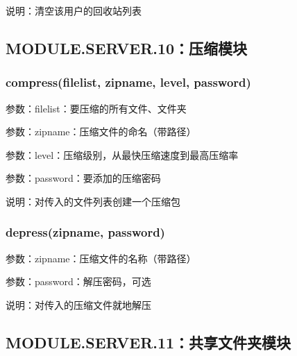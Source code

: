 说明：清空该用户的回收站列表

\subsection{MODULE.SERVER.10：压缩模块}
\subsubsection{compress(filelist, zipname, level, password)}

参数：filelist：要压缩的所有文件、文件夹

参数：zipname：压缩文件的命名（带路径）

参数：level：压缩级别，从最快压缩速度到最高压缩率

参数：password：要添加的压缩密码

说明：对传入的文件列表创建一个压缩包

\subsubsection{depress(zipname, password)}
参数：zipname：压缩文件的名称（带路径）

参数：password：解压密码，可选

说明：对传入的压缩文件就地解压

\subsection{MODULE.SERVER.11：共享文件夹模块}

